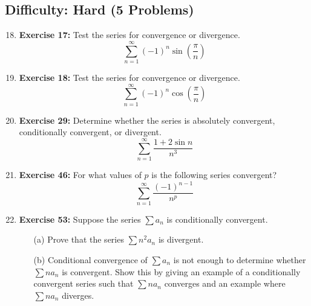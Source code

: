 \documentclass{article}
\begin{document}
\hrulefill
\vspace{1em}

\subsection*{Difficulty: Hard (5 Problems)}
\begin{enumerate}
    \setcounter{enumi}{17} %
    \item \textbf{Exercise 17:} Test the series for convergence or divergence.
    \[ \sum_{n=1}^{\infty} (-1)^n \sin\left(\frac{\pi}{n}\right) \]
    
    \item \textbf{Exercise 18:} Test the series for convergence or divergence.
    \[ \sum_{n=1}^{\infty} (-1)^n \cos\left(\frac{\pi}{n}\right) \]
    
    \item \textbf{Exercise 29:} Determine whether the series is absolutely convergent, conditionally convergent, or divergent.
    \[ \sum_{n=1}^{\infty} \frac{1+2\sin n}{n^3} \]
    
    \item \textbf{Exercise 46:} For what values of $p$ is the following series convergent?
    \[ \sum_{n=1}^{\infty} \frac{(-1)^{n-1}}{n^p} \]
    
    \item \textbf{Exercise 53:} Suppose the series $\sum a_n$ is conditionally convergent.
    \begin{enumerate}
        \item[(a)] Prove that the series $\sum n^2 a_n$ is divergent.
        \item[(b)] Conditional convergence of $\sum a_n$ is not enough to determine whether $\sum n a_n$ is convergent. Show this by giving an example of a conditionally convergent series such that $\sum n a_n$ converges and an example where $\sum n a_n$ diverges.
    \end{enumerate}
\end{enumerate}
\end{document}
